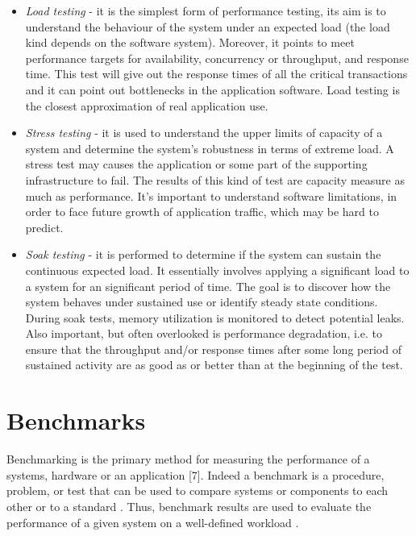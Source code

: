 \begin{itemize}
\item \textit{Load testing} - it is the simplest form of performance testing, its aim is to understand the behaviour of the system under an expected load (the load kind depends on the software system). Moreover, it points to meet performance targets for availability, concurrency or throughput, and response time. This test will give out the response times of all the critical transactions and it can point out bottlenecks in the application software. Load testing is the closest approximation of real application use.

\item \textit{Stress testing} -  it is used to understand the upper limits of capacity of a system and determine the system's robustness in terms of extreme load. A stress test may causes the application or some part of the supporting infrastructure to fail. The results of this kind of test are  capacity measure as much as performance. It's important to understand software limitations, in order to face future growth of application traffic, which may be hard to predict.

\item \textit{Soak testing} - it is performed to determine if the system can sustain the continuous expected load. It essentially involves applying a significant load to a system for an significant period of time. The goal is to discover how the system behaves under sustained use or identify steady state conditions. During soak tests, memory utilization is monitored to detect potential leaks. Also important, but often overlooked is performance degradation, i.e. to ensure that the throughput and/or response times after some long period of sustained activity are as good as or better than at the beginning of the test. 
\end{itemize} 

\section{Benchmarks}\label{sec:benchmarking}

Benchmarking is the primary method for measuring the performance of a systems, hardware or an application [7]. Indeed a benchmark is a procedure, problem, or test that can be used to compare systems or components to each other or to a standard \cite{IEEEStd610.12-1990:glossary}. Thus, benchmark results are used to evaluate the performance of a given system on a well-defined workload \cite{Menasce:2001:CPW:560806}.

